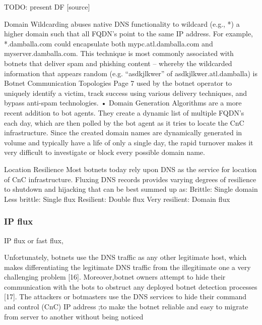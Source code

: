 TODO: present DF
[source]

Domain Wildcarding 
abuses native DNS functionality to wildcard (e.g., *) a
higher domain such that all FQDN’s point to the same IP address. For example,
*.damballa.com could encapsulate both mypc.atl.damballa.com and
myserver.damballa.com. This technique is most commonly associated with
botnets that deliver spam and phishing content – whereby the wildcarded
information that appears random (e.g. “asdkjlkwer” of asdkjlkwer.atl.damballa) is 
Botnet Communication Topologies
Page 7
used by the botnet operator to uniquely identify a victim, track success using
various delivery techniques, and bypass anti-spam technologies.
• Domain Generation Algorithms 
are a more recent addition to bot agents. They
create a dynamic list of multiple FQDN’s each day, which are then polled by the
bot agent as it tries to locate the CnC infrastructure. Since the created domain
names are dynamically generated in volume and typically have a life of only a
single day, the rapid turnover makes it very difficult to investigate or block every
possible domain name.

   Location Resilience
Most botnets today rely upon DNS as the service for location of CnC infrastructure.
Fluxing DNS records provides varying degrees of resilience to shutdown and hijacking
that can be best summed up as:
Brittle: Single domain
Less brittle: Single flux
Resilient: Double flux
Very resilient: Domain flux


\subsubsection{IP flux}
IP flux or fast flux, 

Unfortunately, botnets use the DNS traffic as any other legitimate host, which makes differentiating the legitimate DNS traffic from the illegitimate one a very challenging problem [16]. Moreover,botnet owners attempt to hide their communication with the bots to obstruct any deployed botnet detection processes [17]. The attackers or botmasters use the DNS services to hide their command and control (CnC) IP address ;to make the botnet reliable and easy to migrate from server to another without being noticed

